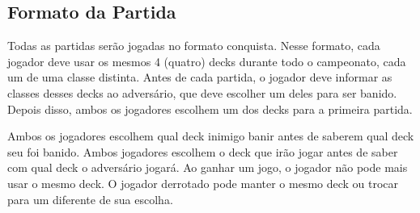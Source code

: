 \subsection{Formato da Partida}

Todas as partidas serão jogadas no formato conquista. Nesse formato, cada jogador deve usar os mesmos 4 (quatro) decks durante todo o campeonato, cada um de uma classe distinta. Antes de cada partida, o jogador deve informar as classes desses decks ao adversário, que deve escolher um deles para ser banido. Depois disso, ambos os jogadores escolhem um dos decks para a primeira partida.

Ambos os jogadores escolhem qual deck inimigo banir antes de saberem qual deck seu foi banido. Ambos jogadores escolhem o deck que irão jogar antes de saber com qual deck o adversário jogará. Ao ganhar um jogo, o jogador não pode mais usar o mesmo deck. O jogador derrotado pode manter o mesmo deck ou trocar para um diferente de sua escolha.